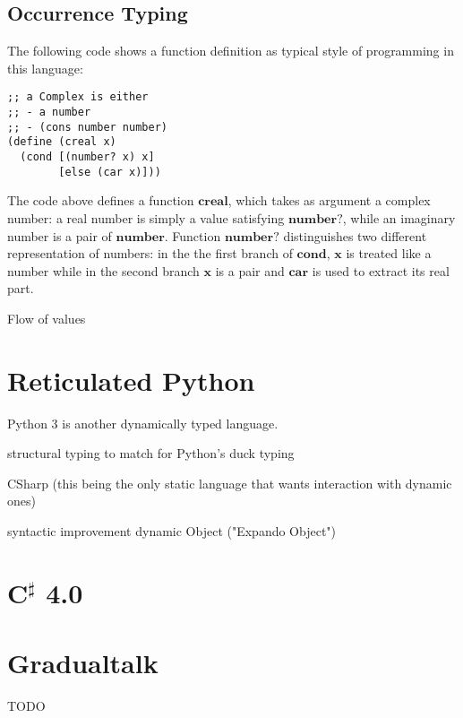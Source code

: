 \subsection{Occurrence Typing}

The following code shows a function definition as typical style of programming in this language:

\begin{verbatim}
;; a Complex is either
;; - a number
;; - (cons number number)
(define (creal x)
  (cond [(number? x) x]
        [else (car x)]))
\end{verbatim}

The code above defines a function $\textbf{creal}$, which takes as argument
a complex number: a real number is simply a value satisfying $\textbf{number?}$,
while an imaginary number is a pair of $\textbf{number}$.
Function $\textbf{number?}$ distinguishes two different representation of numbers:
in the the first branch of $\textbf{cond}$, $\textbf{x}$ is treated like a number
while in the second branch $\textbf{x}$ is a pair and $\textbf{car}$ is used
to extract its real part.


Flow of values

\section{Reticulated Python}

Python 3 is another dynamically typed language.

structural typing to match for Python's duck typing

CSharp (this being the only static language that wants interaction with dynamic ones)

syntactic improvement
dynamic Object ("Expando Object")

\section{C$^\sharp$ 4.0}


\section{Gradualtalk}

TODO